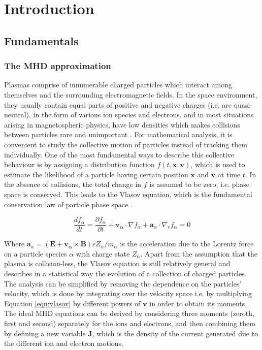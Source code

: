 \chapter{Introduction}

\section{Fundamentals}


\subsection{The MHD approximation}

Plasmas comprise of innumerable charged particles which interact among themselves and the surrounding electromagnetic fields. In the space environment, they usually contain equal parts of positive and negative charges (i.e. are quasi-neutral), in the form of various ion species and electrons, and in most situations arising in magnetospheric physics, have low densities which makes collisions between particles rare and unimportant \cite{Bruno2013TheLaboratory}. For mathematical analysis, it is convenient to study the collective motion of particles instead of tracking them individually. One of the most fundamental ways to describe this collective behaviour is by assigning a distribution function $f(t, \mathbf{x}, \mathbf{v})$, which is used to estimate the likelihood of a particle having certain position $\mathbf{x}$ and $\mathbf{v}$ at time $t$. In the absence of collisions, the total change in $f$ is assumed to be zero, i.e. phase space is conserved. This leads to the Vlasov equation, which is the fundamental conservation law of particle phase space \cite{Chen1995IntroductionPhysics,Gombosi1998PhysicsEnvironment}. 

\begin{equation}
    \frac{df_\alpha}{dt} = \frac{\partial f_\alpha}{\partial t} + \mathbf{v_\alpha}\cdot\nabla f_\alpha + \mathbf{a}_\alpha \cdot \nabla_v f_\alpha = 0
    \label{eqn:vlasov}
\end{equation}

Where $\mathbf{a}_\alpha = (\mathbf{E} + \mathbf{v_\alpha} \times \mathbf{B})e Z_\alpha/m_\alpha$ is the acceleration due to the Lorentz force on a particle species $\alpha$ with charge state $Z_\alpha$. Apart from the assumption that the plasma is collision-less, the Vlasov equation is still relatively general and describes in a statistical way the evolution of a collection of charged particles. The analysis can be simplified by removing the dependence on the particles' velocity, which is done by integrating over the velocity space i.e. by multiplying Equation \ref{eqn:vlasov} by different powers of $\mathbf{v}$ in order to obtain its moments. The ideal MHD equations can be derived by considering three moments (zeroth, first and second) separately for the ions and electrons, and then combining them by defining a new variable $\mathbf{J}$, which is the density of the current generated due to the different ion and electron motions. 

